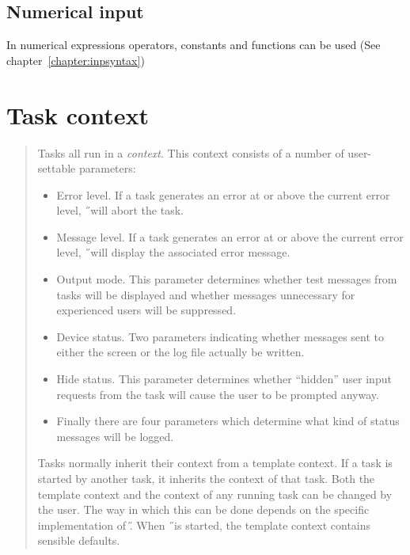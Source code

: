 \subsection{Numerical input}
In numerical expressions operators, constants and functions can be used (See
chapter~\ref{chapter:inpsyntax})

\section{Task context}
\begin{quote}
\small
Tasks all run in a {\em context\/}. This context consists of a number of
user-settable parameters:
\begin{itemize}
\item
Error level. If a task generates an error at or above the current error level,
\H\ will abort the task.
\item
Message level. If a task generates an error at or above the current error level,
\H\ will display the associated error message.
\item
Output mode. This parameter determines whether test messages from tasks will be
displayed and whether messages unnecessary for experienced users will be
suppressed.
\item
Device status. Two parameters indicating whether messages sent to either the
screen or the log file actually be written.
\item
Hide status. This parameter determines whether ``hidden'' user input requests
from the task will cause the user to be prompted anyway.
\item
Finally there are four parameters which determine what kind of status messages
will be logged.
\end{itemize}
Tasks normally inherit their context from a template context. If a task is
started by another task, it inherits the context of that task.
Both the template context and the context of any running task can be changed by
the user. The way in which this can be done depends on the specific 
implementation of \H.
When \H\ is started, the template context contains sensible defaults.
\end{quote}

\section{\tH}
